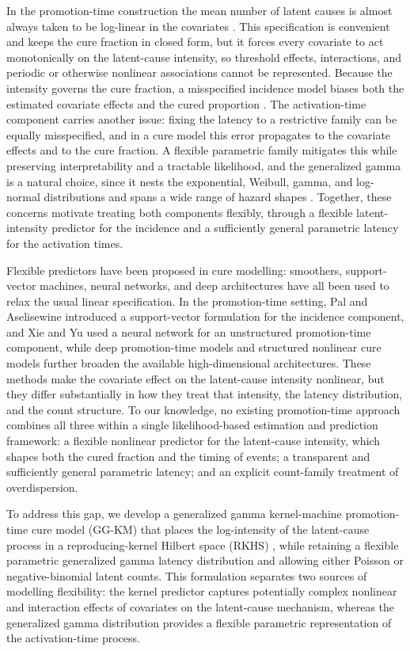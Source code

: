 {
In the promotion-time construction the mean number of latent causes is
almost always taken to be log-linear in the covariates
\cite{chen1999,rodrigues2009}. This specification is convenient and
keeps the cure fraction in closed form, but it forces every covariate
to act monotonically on the latent-cause intensity, so threshold effects,
interactions, and periodic or otherwise nonlinear associations cannot be
represented. Because the intensity governs the cure fraction, a
misspecified incidence model biases both the estimated covariate effects
and the cured proportion \cite{amico2018}. The activation-time component
carries another issue: fixing the latency to a restrictive family can be
equally misspecified, and in a cure model this error propagates to the
covariate effects and to the cure fraction. A flexible parametric family
mitigates this while preserving interpretability and a tractable
likelihood, and the generalized gamma is a natural choice, since it
nests the exponential, Weibull, gamma, and log-normal distributions and
spans a wide range of hazard shapes
\cite{stacy1962,prentice1974,cox2007}. Together, these concerns motivate
treating both components flexibly, through a flexible latent-intensity
predictor for the incidence and a sufficiently general parametric latency
for the activation times.
}

{
Flexible predictors have been proposed in cure modelling: smoothers,
support-vector machines, neural networks, and deep architectures have all
been used to relax the usual linear specification. In the promotion-time
setting, Pal and Aselisewine\cite{pal2023} introduced a support-vector
formulation for the incidence component, and Xie and Yu\cite{xie2021}
used a neural network for an unstructured promotion-time component,
while deep promotion-time models and structured nonlinear cure models
further broaden the available high-dimensional architectures\cite{medina2024,feng2026}.
These methods make the covariate effect on the latent-cause intensity
nonlinear, but they differ substantially in how they treat that
intensity, the latency distribution, and the count structure. To our
knowledge, no existing promotion-time approach combines all three within
a single likelihood-based estimation and prediction framework: a
flexible nonlinear predictor for the latent-cause intensity, which shapes
both the cured fraction and the timing of events; a transparent and
sufficiently general parametric latency; and an explicit count-family
treatment of overdispersion.
}

To address this gap, we develop a generalized gamma kernel-machine
promotion-time cure model (GG-KM) that places the log-intensity of
the latent-cause process in a reproducing-kernel Hilbert space (RKHS)
\cite{kimeldorf1971}, while retaining a flexible parametric
generalized gamma latency distribution \cite{stacy1962} and allowing
either Poisson or negative-binomial latent counts. This formulation
separates two sources of modelling flexibility: the kernel predictor
captures potentially complex nonlinear and interaction effects of
covariates on the latent-cause mechanism, whereas the generalized
gamma distribution provides a flexible parametric representation of
the activation-time process.


